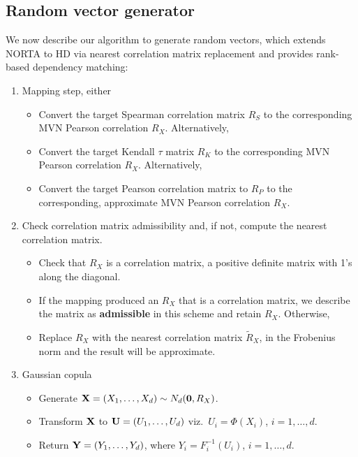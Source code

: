 \documentclass{article}
\begin{document}
\hypertarget{rand-vec-gen}{%
\subsection{Random vector generator}\label{rand-vec-gen}}

We now describe our algorithm to generate random vectors, which extends
NORTA to HD via nearest correlation matrix replacement and provides
rank-based dependency matching:

\begin{enumerate}
\def\labelenumi{\arabic{enumi}.}
\tightlist
\item
  Mapping step, either

  \begin{itemize}
  \tightlist
  \item
    Convert the target Spearman correlation matrix \(R_S\) to the
    corresponding MVN Pearson correlation \(R_X\). Alternatively,
  \item
    Convert the target Kendall \(\tau\) matrix \(R_K\) to the
    corresponding MVN Pearson correlation \(R_X\). Alternatively,
  \item
    Convert the target Pearson correlation matrix to \(R_P\) to the
    corresponding, approximate MVN Pearson correlation \(R_X\).
  \end{itemize}
\item
  Check correlation matrix admissibility and, if not, compute the
  nearest correlation matrix.

  \begin{itemize}
  \tightlist
  \item
    Check that \(R_X\) is a correlation matrix, a positive definite
    matrix with 1's along the diagonal.
  \item
    If the mapping produced an \(R_X\) that is a correlation matrix, we
    describe the matrix as \textbf{admissible} in this scheme and retain
    \(R_X\). Otherwise,
  \item
    Replace \(R_X\) with the nearest correlation matrix \(\tilde{R}_X\),
    in the Frobenius norm and the result will be approximate.
  \end{itemize}
\item
  Gaussian copula

  \begin{itemize}
  \tightlist
  \item
    Generate \({\bf X}=(X_1, \ldots, X_d) \sim N_d({\bf 0}, R_X)\).
  \item
    Transform \({\bf X}\) to \({\bf U} = (U_1, \ldots, U_d)\)
    viz.~\(U_i=\Phi(X_i)\), \(i=1, \ldots, d\).
  \item
    Return \({\bf Y} = (Y_1, \ldots, Y_d)\), where
    \(Y_i=F_i^{-1}(U_i)\), \(i=1, \ldots, d\).
  \end{itemize}
\end{enumerate}
\end{document}
